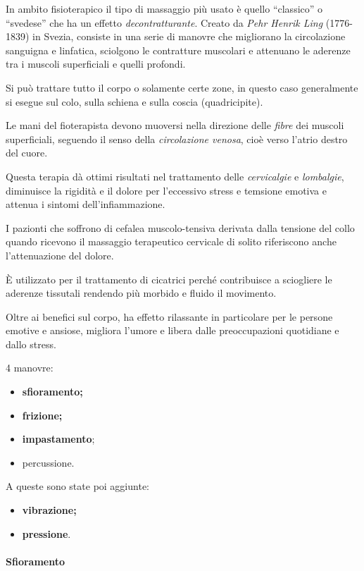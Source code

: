 In ambito fisioterapico il tipo di massaggio più usato è quello
``classico'' o ``svedese'' che ha un effetto \emph{decontratturante}.
Creato da \emph{Pehr Henrik Ling} (1776-1839) in Svezia, consiste in una
serie di manovre che migliorano la circolazione sanguigna e linfatica,
sciolgono le contratture muscolari e attenuano le aderenze tra i muscoli
superficiali e quelli profondi.

Si può trattare tutto il corpo o solamente certe zone, in questo caso
generalmente si esegue sul colo, sulla schiena e sulla coscia
(quadricipite).

Le mani del fioterapista devono muoversi nella direzione delle
\emph{fibre} dei muscoli superficiali, seguendo il senso della
\emph{circolazione venosa}, cioè verso l'atrio destro del cuore.

Questa terapia dà ottimi risultati nel trattamento delle
\emph{cervicalgie} e \emph{lombalgie}, diminuisce la rigidità e il
dolore per l'eccessivo stress e temsione emotiva e attenua i sintomi
dell'infiammazione.

I pazionti che soffrono di cefalea muscolo-tensiva derivata dalla
tensione del collo quando ricevono il massaggio terapeutico cervicale di
solito riferiscono anche l'attenuazione del dolore.

È utilizzato per il trattamento di cicatrici perché contribuisce a
sciogliere le aderenze tissutali rendendo più morbido e fluido il
movimento.

Oltre ai benefici sul corpo, ha effetto rilassante in particolare per le
persone emotive e ansiose, migliora l'umore e libera dalle
preoccupazioni quotidiane e dallo stress.

4 manovre:

\begin{itemize}
\item
  \textbf{sfioramento;}
\item
  \textbf{frizione;}
\item
  \textbf{impastamento};
\item
  percussione.
\end{itemize}

A queste sono state poi aggiunte:

\begin{itemize}
\item
  \textbf{vibrazione;}
\item
  \textbf{pressione}.
\end{itemize}
\paragraph{Sfioramento}

